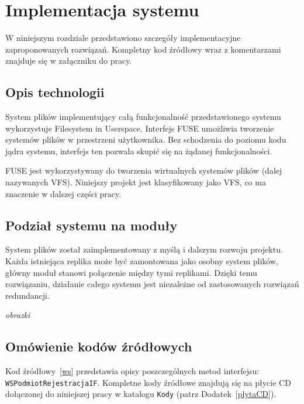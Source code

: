 \chapter{Implementacja systemu}
\thispagestyle{chapterBeginStyle}
W niniejszym rozdziale przedstawiono szczegóły implementacyjne zaproponowanych rozwiązań. Kompletny kod źródłowy wraz z komentarzami znajduje się w załączniku do pracy.

\section{Opis technologii}

System plików implementujący całą funkcjonalność przedstawionego systemu wykorzystuje Filesystem in Userspace. Interfejs FUSE umożliwia tworzenie systemów plików w przestrzeni użytkownika. Bez schodzenia do poziomu kodu jądra systemu, interfejs ten pozwala skupić się na żądanej funkcjonalności.

FUSE jest wykorzystywany do tworzenia wirtualnych systemów plików (dalej nazywanych VFS). Niniejszy projekt jest klasyfikowany jako VFS, co ma znaczenie w dalszej części pracy.

\section{Podział systemu na moduły}
System plików został zaimplementowany z myślą i dalszym rozwoju projektu. Każda istniejąca replika może być zamontowana jako osobny system plików, główny moduł stanowi połączenie między tymi replikami. Dzięki temu rozwiązaniu, działanie całego systemu jest niezależne od zastosowanych rozwiązań redundancji.

\textit{obrazki}

\section{Omówienie kodów źródłowych}

{\color{dgray}
Kod źródłowy~\ref{ws} przedstawia opisy poszczególnych metod interfejsu: \texttt{WSPodmiotRejestracjaIF}. Kompletne
kody źródłowe znajdują się na płycie CD dołączonej do niniejszej pracy w katalogu \texttt{Kody} (patrz Dodatek~\ref{plytaCD}).
}
